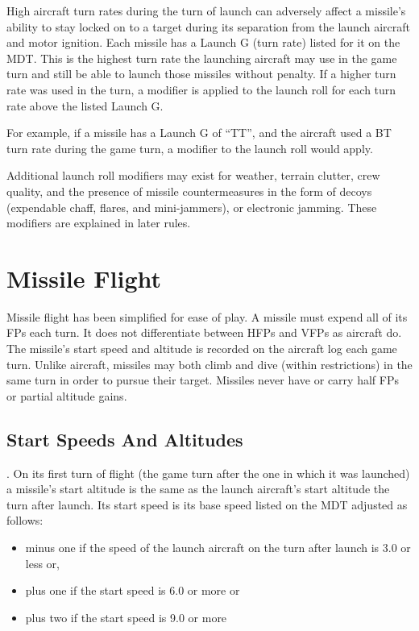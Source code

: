 High aircraft turn rates during the turn of launch can adversely affect a missile's ability to stay locked on to a target during its separation from the launch aircraft and motor ignition. Each missile has a Launch G (turn rate) listed for it on the MDT. This is the highest turn rate the launching aircraft may use in the game turn and still be able to launch those missiles without penalty. If a higher turn rate was used in the turn, a  modifier is applied to the launch roll for each turn rate above the listed Launch G.

For example, if a missile has a Launch G of “TT”, and the aircraft used a BT turn rate during the game turn, a  modifier to the launch roll would apply.

Additional launch roll modifiers may exist for weather, terrain clutter, crew quality, and the presence of missile countermeasures in the form of decoys (expendable chaff, flares, and mini-jammers), or electronic jamming. These modifiers are explained in later rules.

\section{Missile Flight}
\label{rule:missile-flight}

Missile flight has been simplified for ease of play. A missile must expend all of its FPs each turn. It does not differentiate between HFPs and VFPs as aircraft do. The missile's start speed and altitude is recorded on the aircraft log each game turn. Unlike aircraft, missiles may both climb and dive (within restrictions) in the same turn in order to pursue their target. Missiles never have or carry half FPs or partial altitude gains.

\subsection{Start Speeds And Altitudes}. On its first turn of flight (the game turn after the one in which it was launched) a missile's start altitude is the same as the launch aircraft's start altitude the turn after launch. Its start speed is its base speed listed on the MDT adjusted as follows:

\begin{itemize}

    \item minus one if the speed of the launch aircraft on the turn after launch is 3.0 or less or,

    \item plus one if the start speed is 6.0 or more or

    \item plus two if the start speed is 9.0 or more
\end{itemize}

